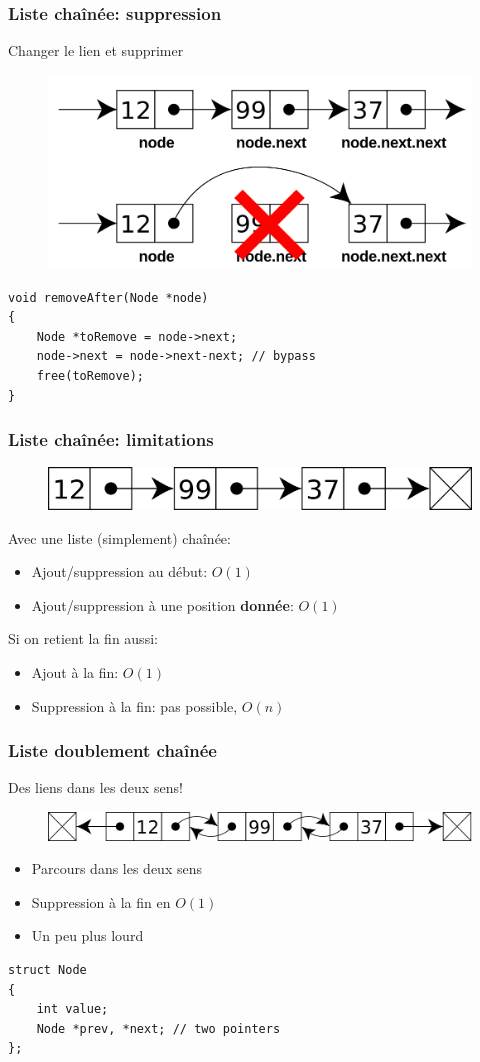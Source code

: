 \documentclass[12pt]{beamer}
\begin{document}
\begin{frame}[fragile]
\frametitle{Liste chaînée: suppression}
Changer le lien et supprimer
\begin{figure}
\centering
\includegraphics[width=.6\textwidth]{img/remove-node}
\end{figure}
\begin{lstlisting}
void removeAfter(Node *node)
{
    Node *toRemove = node->next;
    node->next = node->next-next; // bypass
    free(toRemove);
}
\end{lstlisting}
\end{frame}

\begin{frame}[fragile]
\frametitle{Liste chaînée: limitations}
\begin{figure}
\centering
\includegraphics[width=.8\textwidth]{img/singly-linked}
\end{figure}
Avec une liste (simplement) chaînée:
\begin{itemize}
\item Ajout/suppression au début: $O(1)$
\item Ajout/suppression à une position \textbf{donnée}: $O(1)$
\end{itemize}
Si on retient la fin aussi:
\begin{itemize}
\item Ajout à la fin: $O(1)$
\item Suppression à la fin: pas possible, $O(n)$
\end{itemize}
\end{frame}

\begin{frame}[fragile]
\frametitle{Liste doublement chaînée}
Des liens dans les deux sens!
\begin{figure}
\centering
\includegraphics[width=.8\textwidth]{img/doubly-linked}
\end{figure}
\begin{itemize}
\item Parcours dans les deux sens
\item Suppression à la fin en $O(1)$
\item Un peu plus lourd
\end{itemize}
\begin{lstlisting}
struct Node
{
    int value;
    Node *prev, *next; // two pointers
};
\end{lstlisting}
\end{frame}
\end{document}
